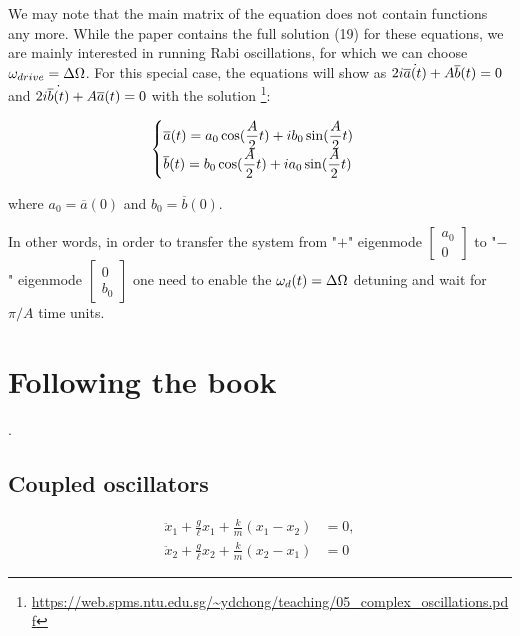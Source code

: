 We may note that the main matrix of the equation does not contain functions any more. While the
paper contains the full solution (19) for these equations, we are mainly interested in running Rabi
oscillations, for which we can choose $\omega_{drive} = \Delta\Omega$. For this special case, the equations will show
as $2i \dot{\overline{a}(t)} + A \overline{b}(t) = 0$ and $2i \dot{\overline{b}(t)} + A \overline{a}(t) = 0$ with the solution
\footnote{\url{https://web.spms.ntu.edu.sg/~ydchong/teaching/05_complex_oscillations.pdf}}:

\[
  \begin{cases}
    \displaystyle \overline{a}(t) = a_0 \cos(\frac{A}{2}t) + i b_0 \sin(\frac{A}{2}t) \\
    \displaystyle \overline{b}(t) = b_0 \cos(\frac{A}{2}t) + i a_0 \sin(\frac{A}{2}t)
  \end{cases}
\]

where $a_0 = \overline{a}(0)$ and $b_0 = \overline{b}(0)$.

In other words, in order to transfer the system from "$+$" eigenmode $\begin{bmatrix}a_0 \\
0\end{bmatrix}$ to "$-$" eigenmode $\begin{bmatrix}0 \\ b_0\end{bmatrix}$ one need to enable the
$\omega_d(t) = \Delta\Omega$ detuning and wait for $\pi/A$ time units.


\section{Following the book}
.

\subsection{Coupled oscillators}

\[
\begin{aligned}
  \ddot{x}_1 + \frac{g}{\ell} x_1 + \frac{k}{m} (x_1 - x_2) &= 0, \\
  \ddot{x}_2 + \frac{g}{\ell} x_2 + \frac{k}{m} (x_2 - x_1) &= 0
\end{aligned}
\]


